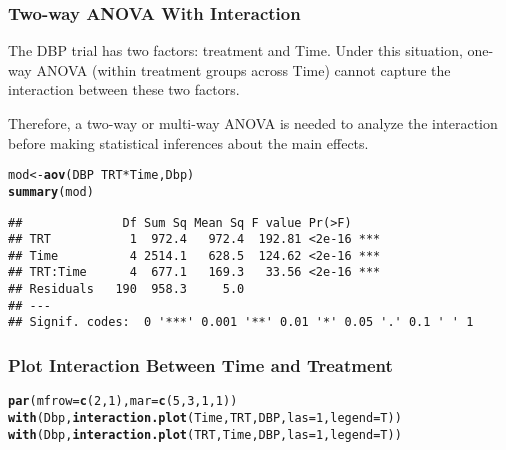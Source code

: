 \documentclass[table,10pt]{beamer}\usepackage[]{graphicx}\usepackage[]{color}
\makeatletter
\newcommand{\hlnum}[1]{\textcolor[rgb]{0.686,0.059,0.569}{#1}}%
\newcommand{\hlopt}[1]{\textcolor[rgb]{0,0,0}{#1}}%
\newcommand{\hlstd}[1]{\textcolor[rgb]{0.345,0.345,0.345}{#1}}%
\newcommand{\hlkwb}[1]{\textcolor[rgb]{0.69,0.353,0.396}{#1}}%
\newcommand{\hlkwc}[1]{\textcolor[rgb]{0.333,0.667,0.333}{#1}}%
\newcommand{\hlkwd}[1]{\textcolor[rgb]{0.737,0.353,0.396}{\textbf{#1}}}%
\newenvironment{kframe}{%
 \def\at@end@of@kframe{}%
 \ifinner\ifhmode%
  \def\at@end@of@kframe{\end{minipage}}%
  \begin{minipage}{\columnwidth}%
 \fi\fi%
 \def\FrameCommand##1{\hskip\@totalleftmargin \hskip-\fboxsep
 \colorbox{shadecolor}{##1}\hskip-\fboxsep
     \hskip-\linewidth \hskip-\@totalleftmargin \hskip\columnwidth}%
 \MakeFramed {\advance\hsize-\width
   \@totalleftmargin\z@ \linewidth\hsize
   \@setminipage}}%
 {\par\unskip\endMakeFramed%
 \at@end@of@kframe}
\newenvironment{knitrout}{}{} %
\makeatother
\begin{document}
\begin{CJK*}{UTF8}{gbsn}
\begin{frame}[t,containsverbatim]
\frametitle{Two-way ANOVA With Interaction}
The DBP trial has two factors: treatment and Time. Under this 
situation, one-way ANOVA (within treatment groups across Time) 
cannot capture the interaction between these two factors.

Therefore, a two-way or multi-way ANOVA is needed to analyze the 
interaction before making statistical inferences about the main 
effects.

\begin{knitrout}\footnotesize
{}\color{fgcolor}\begin{kframe}
\begin{alltt}
\hlstd{mod} \hlkwb{<-} \hlkwd{aov}\hlstd{(DBP} \hlopt{~} \hlstd{TRT}\hlopt{*}\hlstd{Time, Dbp)}
\hlkwd{summary}\hlstd{(mod)}
\end{alltt}
\begin{verbatim}
##              Df Sum Sq Mean Sq F value Pr(>F)    
## TRT           1  972.4   972.4  192.81 <2e-16 ***
## Time          4 2514.1   628.5  124.62 <2e-16 ***
## TRT:Time      4  677.1   169.3   33.56 <2e-16 ***
## Residuals   190  958.3     5.0                   
## ---
## Signif. codes:  0 '***' 0.001 '**' 0.01 '*' 0.05 '.' 0.1 ' ' 1
\end{verbatim}
\end{kframe}
\end{knitrout}
\end{frame}


\begin{frame}[t,containsverbatim]
\frametitle{Plot Interaction Between Time and Treatment}
\begin{knitrout}\footnotesize
{}\color{fgcolor}\begin{kframe}
\begin{alltt}
\hlkwd{par}\hlstd{(}\hlkwc{mfrow}\hlstd{=}\hlkwd{c}\hlstd{(}\hlnum{2}\hlstd{,}\hlnum{1}\hlstd{),} \hlkwc{mar}\hlstd{=}\hlkwd{c}\hlstd{(}\hlnum{5}\hlstd{,}\hlnum{3}\hlstd{,}\hlnum{1}\hlstd{,}\hlnum{1}\hlstd{))}
\hlkwd{with}\hlstd{(Dbp,} \hlkwd{interaction.plot}\hlstd{(Time,TRT,DBP,}\hlkwc{las}\hlstd{=}\hlnum{1}\hlstd{,}\hlkwc{legend}\hlstd{=T))}
\hlkwd{with}\hlstd{(Dbp,} \hlkwd{interaction.plot}\hlstd{(TRT,Time,DBP,}\hlkwc{las}\hlstd{=}\hlnum{1}\hlstd{,}\hlkwc{legend}\hlstd{=T))}
\end{alltt}
\end{kframe}


\end{knitrout}
\end{frame}
\end{CJK*}
\end{document}
